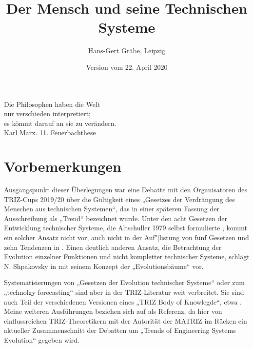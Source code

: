 \documentclass[11pt,a4paper]{article}
\title{Der Mensch und seine Technischen Systeme}
\author{Hans-Gert Gräbe, Leipzig}
\date{Version vom 22. April 2020}
\begin{document}
\maketitle

\begin{flushright}
  Die Philosophen haben die Welt\\ nur verschieden interpretiert;\\ es kömmt
  darauf an sie zu verändern.\\ Karl Marx. 11. Feuerbachthese
\end{flushright}
\section{Vorbemerkungen}

Ausgangspunkt dieser Überlegungen war eine Debatte mit den Organisatoren des
TRIZ-Cups 2019/20 über die Gültigkeit eines „Gesetzes der Verdrängung des
Menschen aus technischen Systemen“, das in einer späteren Fassung der
Ausschreibung als „Trend“ bezeichnet wurde. Unter den acht Gesetzen der
Entwicklung technischer Systeme, die Altschuller 1979 selbst formulierte
\cite[S. 2]{TESE2018}, kommt ein solcher Ansatz nicht vor, auch nicht in der
Auf"|listung von fünf Gesetzen und zehn Tendenzen in
\cite[S. 148\,ff.]{KS2017}.  Einen deutlich anderen Ansatz, die Betrachtung
der Evolution einzelner Funktionen und nicht kompletter technischer Systeme,
schlägt N. Shpakovsky in \cite{Shpakovsky2010} mit seinem Konzept der
„Evolutionsbäume“ vor.

Systematisierungen von „Gesetzen der Evolution technischer Systeme“ oder zum
„technolgy forecasting“ sind aber in der TRIZ-Literatur weit verbreitet. Sie
sind auch Teil der verschiedenen Versionen eines „TRIZ Body of Knowlegde“,
etwa \cite{TBK-2007}. Meine weiteren Ausführungen beziehen sich auf
\cite{TESE2018} als Referenz, da hier von einflussreichen TRIZ-Theoretikern
mit der Autorität der MATRIZ im Rücken ein aktueller Zusammenschnitt der
Debatten um „Trends of Engineering Systems Evolution“ gegeben wird.
\end{document}
